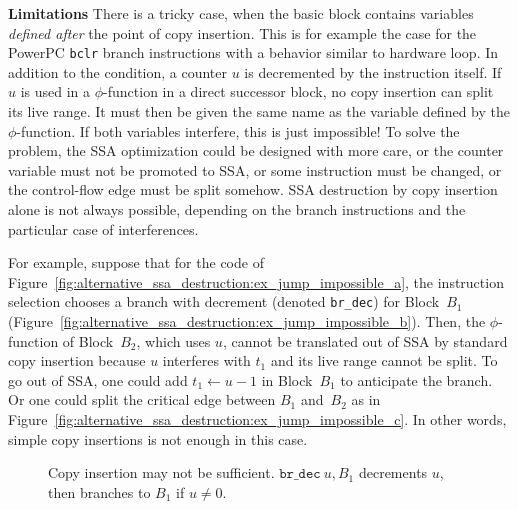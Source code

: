 {\bf Limitations}
There is a  tricky case, when the basic block contains variables
\emph{defined after} the point of copy insertion. This is for example the case for the PowerPC
\texttt{bclr} branch instructions with a behavior similar to hardware loop. In
addition to the condition, a counter $u$ is decremented by the instruction
itself. If $u$ is used in a $\phi$-function in a direct successor block, no
copy insertion can split its live range. It must then be given the same name as
the variable defined by the $\phi$-function. If both variables interfere, this
is just impossible! To solve the problem, the SSA optimization could be
designed with more care, or the counter variable must not be promoted to SSA,
or some instruction must be changed, or the control-flow edge must be split
somehow.  SSA destruction by
copy insertion alone is not always possible, depending on the branch
instructions and the particular case of interferences.

For example, suppose that for the code of
Figure~\ref{fig:alternative_ssa_destruction:ex_jump_impossible_a}, the instruction selection chooses a branch
with decrement (denoted \texttt{br\_dec}) for Block~$B_1$
(Figure~\ref{fig:alternative_ssa_destruction:ex_jump_impossible_b}).  Then, the $\phi$-function of
Block~$B_2$, which uses $u$, cannot be translated out of SSA by standard copy
insertion because $u$ interferes with $t_1$ and its live range cannot be split.
To go out of SSA, one could add $t_1\gets u-1$ in Block~$B_1$ to anticipate the
branch. Or one could split the critical edge between $B_1$ and~$B_2$ as in
Figure~\ref{fig:alternative_ssa_destruction:ex_jump_impossible_c}. In other words, simple copy insertions is not enough in this case.

\begin{figure}[h]
\hfill
{}
\hfill
{}
\caption{Copy insertion may not be sufficient. $\texttt{br\_dec}\ u,B_1$ decrements $u$, then branches to $B_1$ if $u\neq 0$.\label{fig:alternative_ssa_destruction:ex_jump_impossible}}
\end{figure}

